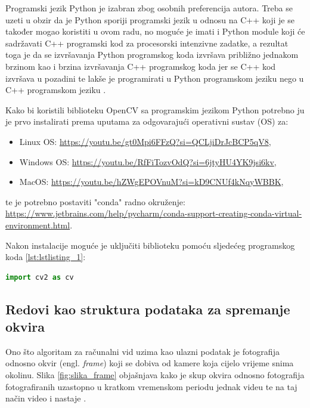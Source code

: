 \documentclass{foi}
\begin{document}
Programski jezik Python je izabran zbog osobnih preferencija autora. Treba se uzeti u obzir da je Python sporiji programski jezik u odnosu na C++ koji je se također mogao koristiti u ovom radu, no moguće je imati i Python module koji će sadržavati C++ programski kod za procesorski intenzivne zadatke, a rezultat toga je da se izvršavanja Python programskog koda izvršava približno jednakom brzinom kao i brzina izvršavanja C++ programskog koda jer se C++ kod izvršava u pozadini te lakše je programirati u Python programskom jeziku nego u C++ programskom jeziku \cite{opencv-python}.

\flushleft Kako bi koristili biblioteku OpenCV sa programskim jezikom Python potrebno ju je prvo instalirati prema uputama za odgovarajući operativni sustav (OS) za:
\begin{itemize}[noitemsep]
    \item Linux OS: \url{https://youtu.be/gt0Mpi6FFzQ?si=QCLjiDrJcBCP5qV8},
    \item Windows OS: \url{https://youtu.be/RfFiTozvOdQ?si=6jtyHU4YK9jsi6kv},
    \item MacOS: \url{https://youtu.be/hZWgEPOVnuM?si=kD9CNUf4kNqyWBBK},
\end{itemize}
te je potrebno postaviti "conda" radno okruženje: \url{https://www.jetbrains.com/help/pycharm/conda-support-creating-conda-virtual-environment.html}.

Nakon instalacije moguće je uključiti biblioteku pomoću sljedećeg programskog koda \ref{lst:lstlisting_1}:
\begin{lstlisting}[language=Python, label={lst:lstlisting_1}, firstnumber=1, style=colored, caption=Uključivanje biblioteke OpenCV za korištenje]
import cv2 as cv
\end{lstlisting}

\justifying

\subsection{Redovi kao struktura podataka za spremanje okvira}

Ono što algoritam za računalni vid uzima kao ulazni podatak je fotografija odnosno okvir (engl. \emph{frame}) koji se dobiva od kamere koja cijelo vrijeme snima okolinu. Slika \ref{fig:slika_frame} objašnjava kako je skup okvira odnosno fotografija fotografiranih uzastopno u kratkom vremenskom periodu jednak videu te na taj način video i nastaje \cite{AnimoticaBlog2020}.
\end{document}

